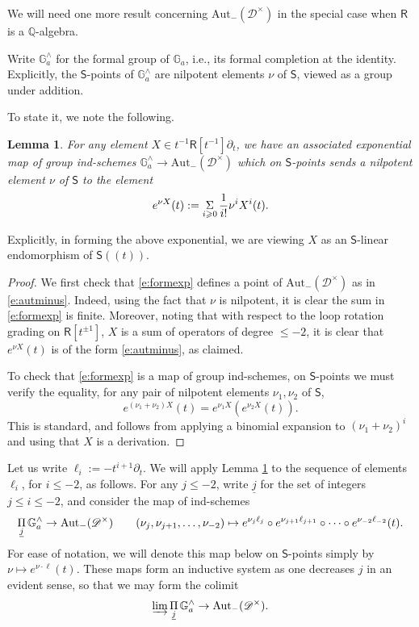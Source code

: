 \documentclass{amsart}
\newtheorem{Lem}[Thm]{Lemma}
\theoremstyle{definition}
\newcommand{\sss}{\subsubsection{}}
\newcommand{\sD}{\mathscr{D}}
\newcommand{\Sing}{\mathsf{S}}
\newcommand{\on}{\mathrm}
\newcommand{\Ring}{\mathsf{R}}
\newcommand{\Am}{\Aut_-(\pD)}
\newcommand{\pD}{\sD^\times}
\newcommand{\Aut}{\on{Aut}}
\numberwithin{equation}{section}
\begin{document}
\sss{} We will need one more result concerning $\Am$ in the special case when $\Ring$ is a $\mathbb{Q}$-algebra. 

  Write $\mathbb{G}^\wedge_{a}$ for the formal group of $\mathbb{G}_a$, i.e., its formal completion at the identity. Explicitly, the $\Sing$-points of $\mathbb{G}^\wedge_{a}$ are nilpotent elements $\nu$ of $\Sing$, viewed as a group under addition. 

To state it, we note the following. 
\begin{Lem} \label{l:formexp} For any element $X \in t^{-1}\Ring[t^{-1}]\partial_t$, we have an associated exponential map of group ind-schemes 
$\mathbb{G}_a^\wedge \rightarrow \Am$ 
which on $\Sing$-points sends a nilpotent element $\nu$ of $\Sing$ to the element
\begin{equation} \label{e:formexp} e^{\nu X}(t) := \underset{i \geqslant 0} \Sigma \hspace{.5mm} \frac{1}{i!} \nu^i X^i(t).\end{equation}
\end{Lem}
Explicitly, in forming the above exponential, we are viewing $X$ as an $\Sing$-linear endomorphism of $\Sing(\!(t)\!)$.  
\begin{proof} We first check that \eqref{e:formexp} defines a point of $\Am$ as in \eqref{e:autminus}. Indeed, using the fact that $\nu$ is nilpotent, it is clear the sum in \eqref{e:formexp} is finite. Moreover, noting that with respect to the loop rotation grading on $\Ring[t^{\pm 1}]$, $X$ is a sum of operators of degree $\leqslant -2$, it is clear that $e^{\nu X}(t)$ is of the form \eqref{e:autminus}, as claimed.  

To check that \eqref{e:formexp} is a map of group ind-schemes, on $\Sing$-points we must verify the equality, for any pair of nilpotent elements $\nu_1, \nu_2$ of $\Sing$, 
$$e^{(\nu_1 + \nu_2)X}(t) = e^{\nu_1 X}(e^{\nu_2 X}(t)).$$
This is standard, and follows from applying a binomial expansion to $(\nu_1 + \nu_2)^i$ and using that $X$ is a derivation. 
\end{proof}

Let us write $\ell_i := -t^{i+1} \partial_t$. We will apply Lemma \ref{l:formexp} to the sequence of elements $\ell_i$, for $i \leqslant -2$, as follows. For any $j \leqslant -2$,  write $\underline{j}$ for the set of integers $j \leqslant i \leqslant -2$, and consider the map of ind-schemes
$$\underset{\underline{j}}\Pi \hspace{.5mm} \mathbb{G}_a^\wedge \rightarrow \Am \quad \quad (\nu_{j}, \nu_{j+1}, \ldots, \nu_{-2}) \mapsto e^{\nu_j \ell_j} \circ e^{\nu_{j+1} \ell_{j+1}} \circ \cdots \circ e^{\nu_{-2} \ell_{-2}} (t).$$For ease of notation, we will denote this map below on $\Sing$-points simply by $\nu \mapsto e^{\nu \cdot \ell}(t)$. 
These maps form an inductive system as one decreases $j$ in an evident sense, so that we may form the colimit
\begin{equation} \label{e:cells} \varinjlim \underset{\underline{j}}\Pi \hspace{.5mm} \mathbb{G}_a^\wedge \rightarrow \Am. \end{equation}
\end{document}
